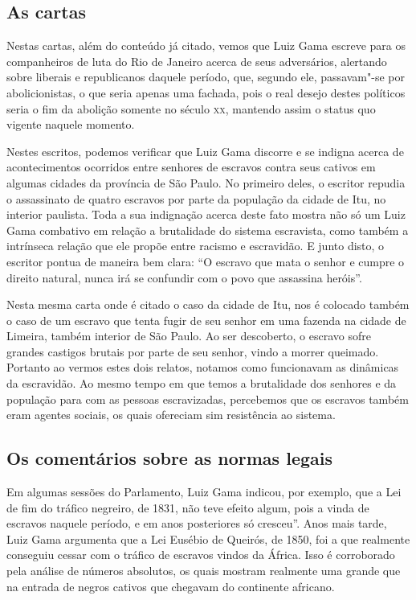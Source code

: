 \documentclass[12pt]{extarticle}
\begin{document}
\subsection{As cartas}

Nestas cartas, além do conteúdo já citado, vemos que Luiz Gama escreve
para os companheiros de luta do Rio de Janeiro acerca de seus
adversários, alertando sobre liberais e republicanos daquele período,
que, segundo ele, passavam"-se por abolicionistas, o que seria apenas uma
fachada, pois o real desejo destes políticos seria o fim da abolição
somente no século \textsc{xx}, mantendo assim o status quo vigente naquele
momento.

Nestes escritos, podemos verificar que Luiz Gama discorre e se indigna
acerca de acontecimentos ocorridos entre senhores de escravos contra
seus cativos em algumas cidades da província de São Paulo. No primeiro
deles, o escritor repudia o assassinato de quatro escravos por parte da
população da cidade de Itu, no interior paulista. Toda a sua indignação
acerca deste fato mostra não só um Luiz Gama combativo em relação a
brutalidade do sistema escravista, como também a intrínseca relação que
ele propõe entre racismo e escravidão. E junto disto, o escritor pontua
de maneira bem clara: ``O escravo que mata o senhor e cumpre o direito
natural, nunca irá se confundir com o povo que assassina heróis''.

Nesta mesma carta onde é citado o caso da cidade de Itu, nos é colocado
também o caso de um escravo que tenta fugir de seu senhor em uma fazenda
na cidade de Limeira, também interior de São Paulo. Ao ser descoberto, o
escravo sofre grandes castigos brutais por parte de seu senhor, vindo a
morrer queimado. Portanto ao vermos estes dois relatos, notamos como
funcionavam as dinâmicas da escravidão. Ao mesmo tempo em que temos a
brutalidade dos senhores e da população para com as pessoas
escravizadas, percebemos que os escravos também eram agentes sociais, os
quais ofereciam sim resistência ao sistema.

\subsection{Os comentários sobre as normas legais}

Em algumas sessões do Parlamento, Luiz Gama indicou, por exemplo, que a
Lei de fim do tráfico negreiro, de 1831, não teve efeito algum, pois a
vinda de escravos naquele período, e em anos posteriores só cresceu''.
Anos mais tarde, Luiz Gama argumenta que a Lei Eusébio de Queirós, de
1850, foi a que realmente conseguiu cessar com o tráfico de escravos
vindos da África. Isso é corroborado pela análise de números absolutos,
os quais mostram realmente uma grande que na entrada de negros cativos
que chegavam do continente africano.
\end{document}
